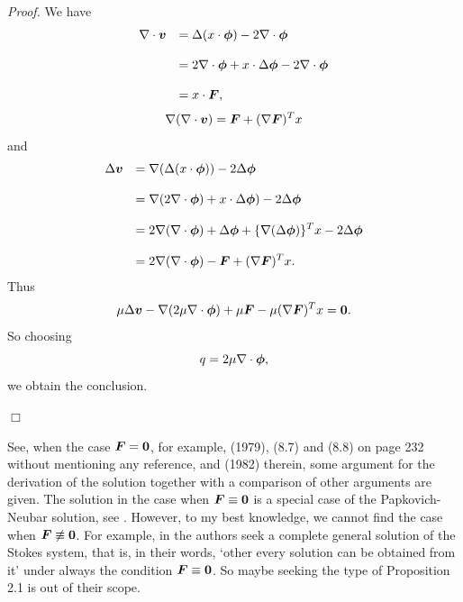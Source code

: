 {\it\noindent Proof.}
We have
$$\begin{array}{ll}
\displaystyle
\nabla\cdot\mbox{\boldmath $v$}
&
\displaystyle
=\Delta(x\cdot\mbox{\boldmath $\phi$})-2\nabla\cdot\mbox{\boldmath $\phi$}
\\
\\
\displaystyle
&
\displaystyle
=2\nabla\cdot\mbox{\boldmath $\phi$}+x\cdot\Delta\mbox{\boldmath $\phi$}-2\nabla\cdot\mbox{\boldmath $\phi$}
\\
\\
\displaystyle
&
\displaystyle
=x\cdot\mbox{\boldmath $F$},
\end{array}
$$
$$\displaystyle
\nabla(\nabla\cdot\mbox{\boldmath $v$})
=\mbox{\boldmath $F$}+(\nabla\mbox{\boldmath $F$})^Tx
$$
and
$$\begin{array}{ll}
\displaystyle
\Delta\mbox{\boldmath $v$}
&
\displaystyle
=\nabla(\Delta(x\cdot\mbox{\boldmath $\phi$}))-2\Delta\mbox{\boldmath $\phi$}
\\
\\
\displaystyle
&
\displaystyle
=\nabla(2\nabla\cdot\mbox{\boldmath $\phi$})+x\cdot\Delta\mbox{\boldmath $\phi$})-2\Delta\mbox{\boldmath $\phi$}
\\
\\
\displaystyle
&
\displaystyle
=2\nabla(\nabla\cdot\mbox{\boldmath $\phi$})+\Delta\mbox{\boldmath $\phi$}+\{\nabla(\Delta\mbox{\boldmath $\phi$})\}^Tx-2\Delta\mbox{\boldmath $\phi$}
\\
\\
\displaystyle
&
\displaystyle
=2\nabla(\nabla\cdot\mbox{\boldmath $\phi$})-\mbox{\boldmath $F$}
+(\nabla\mbox{\boldmath $F$})^Tx.
\end{array}
$$
Thus
$$\displaystyle
\mu\Delta\mbox{\boldmath $v$}
-\nabla(2\mu\nabla\cdot\mbox{\boldmath $\phi$})+\mu\mbox{\boldmath $F$}-\mu(\nabla\mbox{\boldmath $F$})^Tx=\mbox{\boldmath $0$}.
$$
So choosing
$$\displaystyle
q=2\mu\nabla\cdot\mbox{\boldmath $\phi$},
$$
we obtain the conclusion.

\noindent
$\Box$




See, when the case $\mbox{\boldmath $F$}=\mbox{\boldmath $0$}$, for example, \cite{FIIT}(1979), (8.7) and (8.8) on page 232 without mentioning any reference, and \cite{TCB} (1982) therein, some argument for the derivation of the solution together with a comparison of other arguments are given.  The solution in the case when $\mbox{\boldmath $F$}\equiv \mbox{\boldmath $0$}$ is a special case of the Papkovich-Neubar solution, see \cite{TCB}.
However, to my best knowledge, we cannot find the case when $\mbox{\boldmath $F$}\not\equiv \mbox{\boldmath $0$}$.  For example, in \cite{PRA} the authors seek a complete general solution of the Stokes system, that is,
in their words,  `other every solution can be obtained from it' under always the condition 
$\mbox{\boldmath $F$}\equiv \mbox{\boldmath $0$}$.  So maybe seeking the type of Proposition 2.1 is out of their scope.

